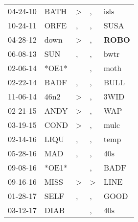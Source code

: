 \begin{supertabular}{p{0.07\textwidth}p{0.06\textwidth}p{0.02\textwidth}p{0.02\textwidth}p{0.06\textwidth}}
 04-24-10\textsuperscript{} &  BATH\textsuperscript{} &  \textgreater &             , &           isls\textsuperscript{} \\
 10-24-11\textsuperscript{} &  ORFE\textsuperscript{} &             , &             , &           SUSA\textsuperscript{} \\
 04-28-12\textsuperscript{} &  down\textsuperscript{} &  \textgreater &             , &  \textbf{ROBO\textsuperscript{}} \\
 06-08-13\textsuperscript{} &   SUN\textsuperscript{} &             , &             , &           bwtr\textsuperscript{} \\
 02-06-14\textsuperscript{} &                   *OE1* &               &             , &           moth\textsuperscript{} \\
 02-22-14\textsuperscript{} &  BADF\textsuperscript{} &             , &             , &           BULL\textsuperscript{} \\
 11-06-14\textsuperscript{} &  46n2\textsuperscript{} &  \textgreater &             , &           3WID\textsuperscript{} \\
 02-21-15\textsuperscript{} &  ANDY\textsuperscript{} &  \textgreater &             , &            WAP\textsuperscript{} \\
 03-19-15\textsuperscript{} &  COND\textsuperscript{} &  \textgreater &             , &           mulc\textsuperscript{} \\
 02-14-16\textsuperscript{} &  LIQU\textsuperscript{} &             , &             , &           temp\textsuperscript{} \\
 05-28-16\textsuperscript{} &   MAD\textsuperscript{} &             , &             , &            40s\textsuperscript{} \\
 09-08-16\textsuperscript{} &                   *OE1* &               &             , &           BADF\textsuperscript{} \\
 09-16-16\textsuperscript{} &  MISS\textsuperscript{} &  \textgreater &  \textgreater &           LINE\textsuperscript{} \\
 01-28-17\textsuperscript{} &  SELF\textsuperscript{} &             , &             , &           GOOD\textsuperscript{} \\
 03-12-17\textsuperscript{} &  DIAB\textsuperscript{} &               &             , &            40s\textsuperscript{} \\

\end{supertabular}
